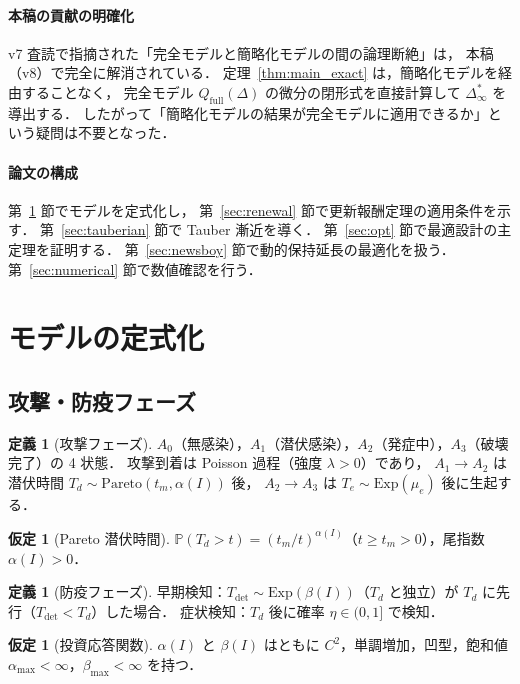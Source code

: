 \documentclass[12pt,a4paper]{article}
\theoremstyle{plain}
\theoremstyle{definition}
\newtheorem{definition}[theorem]{定義}
\newtheorem{assumption}[theorem]{仮定}
\theoremstyle{remark}
\newcommand{\Prob}{\mathbb{P}}
\newcommand{\Qf}{Q_{\mathrm{full}}}
\newcommand{\Tdet}{T_{\mathrm{det}}}
\newcommand{\betaI}{\beta(I)}
\newcommand{\alphI}{\alpha(I)}
\newcommand{\Dinf}{\Delta^{*}_{\infty}}
\begin{document}
\paragraph{本稿の貢献の明確化}
v7 査読で指摘された「完全モデルと簡略化モデルの間の論理断絶」は，
本稿（v8）で完全に解消されている．
定理~\ref{thm:main_exact} は，簡略化モデルを経由することなく，
完全モデル $\Qf(\Delta)$ の微分の閉形式を直接計算して $\Dinf$ を導出する．
したがって「簡略化モデルの結果が完全モデルに適用できるか」という疑問は不要となった．

\paragraph{論文の構成}
第~\ref{sec:model} 節でモデルを定式化し，
第~\ref{sec:renewal} 節で更新報酬定理の適用条件を示す．
第~\ref{sec:tauberian} 節で Tauber 漸近を導く．
第~\ref{sec:opt} 節で最適設計の主定理を証明する．
第~\ref{sec:newsboy} 節で動的保持延長の最適化を扱う．
第~\ref{sec:numerical} 節で数値確認を行う．

\section{モデルの定式化}
\label{sec:model}

\subsection{攻撃・防疫フェーズ}

\begin{definition}[攻撃フェーズ]\label{def:attack}
$A_0$（無感染），$A_1$（潜伏感染），$A_2$（発症中），$A_3$（破壊完了）の 4 状態．
攻撃到着は Poisson 過程（強度 $\lambda>0$）であり，
$A_1\to A_2$ は潜伏時間 $T_d\sim\mathrm{Pareto}(t_m,\alphI)$ 後，
$A_2\to A_3$ は $T_e\sim\mathrm{Exp}(\mu_e)$ 後に生起する．
\end{definition}

\begin{assumption}[Pareto 潜伏時間]\label{ass:pareto}
$\Prob(T_d>t)=(t_m/t)^{\alphI}$（$t\ge t_m>0$），尾指数 $\alphI>0$．
\end{assumption}

\begin{definition}[防疫フェーズ]\label{def:defense}
早期検知：$\Tdet\sim\mathrm{Exp}(\betaI)$（$T_d$ と独立）が $T_d$ に先行（$\Tdet<T_d$）した場合．
症状検知：$T_d$ 後に確率 $\eta\in(0,1]$ で検知．
\end{definition}

\begin{assumption}[投資応答関数]\label{ass:alpha}
$\alphI$ と $\betaI$ はともに $C^2$，単調増加，凹型，飽和値 $\alpha_{\max}<\infty$，$\beta_{\max}<\infty$ を持つ．
\end{assumption}
\end{document}
